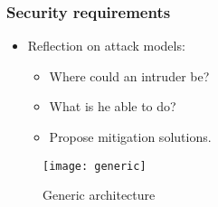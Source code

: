 \documentclass{beamer}
\begin{document}
%

\begin{frame}
    \frametitle{Security requirements}

    \begin{itemize}
        \item Reflection on attack models:
        \begin{itemize}
            \item Where could an intruder be?
            \item What is he able to do?
            \item Propose mitigation solutions.
        \end{itemize}
    \end{itemize}
    \vspace{-3em}
    \begin{figure}[htb]
        \centering
        \texttt{[image: generic]}
        \caption{Generic architecture}
    \end{figure}
\end{frame}
\end{document}
